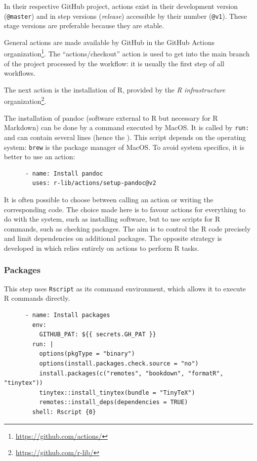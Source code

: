 \documentclass[
  12pt,
  american,
  a4paper,
  extrafontsizes,onecolumn,openright
  ]{memoir}
\newlength{\rf}
\begin{document}
In their respective GitHub project, actions exist in their development version (\texttt{@master}) and in step versions (\emph{release}) accessible by their number (\texttt{@v1}).
These stage versions are preferable because they are stable.

General actions are made available by GitHub in the GitHub Actions organization\footnote{\url{https://github.com/actions/}}.
The \enquote{actions/checkout} action is used to get into the main branch of the project processed by the workflow: it is usually the first step of all workflows.

The next action is the installation of R, provided by the \emph{R infrastructure} organization\footnote{\url{https://github.com/r-lib/}}.

The installation of pandoc (software external to R but necessary for R Markdown) can be done by a command executed by MacOS.
It is called by \texttt{run:} and can contain several lines (hence the \texttt{\textbar{}}).
This script depends on the operating system: \texttt{brew} is the package manager of MacOS.
To avoid system specifics, it is better to use an action:

\begin{verbatim}
      - name: Install pandoc
        uses: r-lib/actions/setup-pandoc@v2
\end{verbatim}

It is often possible to choose between calling an action or writing the corresponding code.
The choice made here is to favour actions for everything to do with the system, such as installing software, but to use scripts for R commands, such as checking packages.
The aim is to control the R code precisely and limit dependencies on additional packages.
The opposite strategy is developed in \textcite{Wickham2023} which relies entirely on actions to perform R tasks.

\subsubsection{Packages}\label{sec:packages-ci}

This step uses \texttt{Rscript} as its command environment, which allows it to execute R commands directly.

\begin{verbatim}
      - name: Install packages
        env:
          GITHUB_PAT: ${{ secrets.GH_PAT }}
        run: |
          options(pkgType = "binary")
          options(install.packages.check.source = "no")
          install.packages(c("remotes", "bookdown", "formatR", "tinytex"))
          tinytex::install_tinytex(bundle = "TinyTeX")
          remotes::install_deps(dependencies = TRUE)
        shell: Rscript {0}
\end{verbatim}
\end{document}
